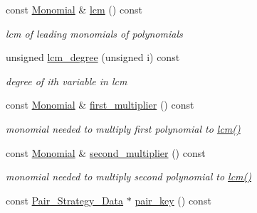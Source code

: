 \begin{Indent}
\begin{DoxyCompactItemize}
const \hyperlink{group__polygroup_class_monomial}{Monomial} \& \hyperlink{group___g_b_computation_a336387d4ddd4f184399212599dbcb130}{lcm} () const
\begin{DoxyCompactList}\small\item\em lcm of leading monomials of polynomials \end{DoxyCompactList}\item 
\mbox{\label{group___g_b_computation_a4b9daf511d0ae94c24a5a0b8aa07588b}} 
unsigned \hyperlink{group___g_b_computation_a4b9daf511d0ae94c24a5a0b8aa07588b}{lcm\+\_\+degree} (unsigned i) const
\begin{DoxyCompactList}\small\item\em degree of ith variable in lcm \end{DoxyCompactList}\item 
\mbox{\label{group___g_b_computation_a714e1ea76b993148dd55b05979b4b874}} 
const \hyperlink{group__polygroup_class_monomial}{Monomial} \& \hyperlink{group___g_b_computation_a714e1ea76b993148dd55b05979b4b874}{first\+\_\+multiplier} () const
\begin{DoxyCompactList}\small\item\em monomial needed to multiply first polynomial to \hyperlink{group___g_b_computation_a336387d4ddd4f184399212599dbcb130}{lcm()} \end{DoxyCompactList}\item 
\mbox{\label{group___g_b_computation_abb08fb4bfc80732a92438cc6856503a1}} 
const \hyperlink{group__polygroup_class_monomial}{Monomial} \& \hyperlink{group___g_b_computation_abb08fb4bfc80732a92438cc6856503a1}{second\+\_\+multiplier} () const
\begin{DoxyCompactList}\small\item\em monomial needed to multiply second polynomial to \hyperlink{group___g_b_computation_a336387d4ddd4f184399212599dbcb130}{lcm()} \end{DoxyCompactList}\item 
\mbox{\label{group___g_b_computation_a8fa18f909cc3b88af41a5796bd6c2424}} 
const \hyperlink{group__strategygroup_class_pair___strategy___data}{Pair\+\_\+\+Strategy\+\_\+\+Data} $\ast$ \hyperlink{group___g_b_computation_a8fa18f909cc3b88af41a5796bd6c2424}{pair\+\_\+key} () const

\end{DoxyCompactItemize}
\end{Indent}
